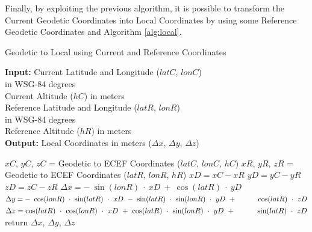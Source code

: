 Finally, by exploiting the previous algorithm, it is possible to transform the Current Geodetic Coordinates into Local Coordinates by using some Reference Geodetic Coordinates and Algorithm \ref{alg:local}. 
\begin{algorithm}[ht!]
\caption{Geodetic to Local using Current and Reference Coordinates}
\label{alg:local}
    \hspace*{\algorithmicindent} \textbf{Input:} Current Latitude and Longitude ($latC$, $lonC$)\\
        \hspace*{5em} in WSG-84 degrees\\
    \hspace*{4em} Current Altitude ($hC$) in meters\\
    \hspace*{4em} Reference Latitude and Longitude ($latR$, $lonR$)\\
        \hspace*{5em} in WSG-84 degrees\\
    \hspace*{4em} Reference Altitude ($hR$) in meters \\
    \hspace*{\algorithmicindent} \textbf{Output:} Local Coordinates in meters ($\Delta x$, $\Delta y$, $\Delta z$)
  \begin{algorithmic}[1]
    \STATE $xC$, $yC$, $zC$ = Geodetic to ECEF Coordinates ($latC$, $lonC$, $hC$)
    \STATE $xR$, $yR$, $zR$ = Geodetic to ECEF Coordinates ($latR$, $lonR$, $hR$)
    \STATE $xD = xC - xR$
    \STATE $yD = yC - yR$
    \STATE $zD = zC - zR$
    \STATE $\Delta x = -~\sin(lonR)~\cdot~xD~+~\cos(latR)~\cdot~yD$
    \STATE $\Delta y = -~\cos(lonR)~\cdot~\sin(latR)~\cdot~xD~-~\sin(latR)~\cdot~\sin(lonR)~\cdot~yD~+ \hspace*{3em} \cos(latR)~\cdot~zD$
    \STATE $\Delta z = \cos(latR)~\cdot~\cos(lonR)~\cdot~xD~+~\cos(latR)~\cdot~\sin(lonR)~\cdot~yD~+  \hspace*{3em} \sin(latR)~\cdot~zD$
    \STATE return $\Delta x$, $\Delta y$, $\Delta z$
    \end{algorithmic}

\end{algorithm}


